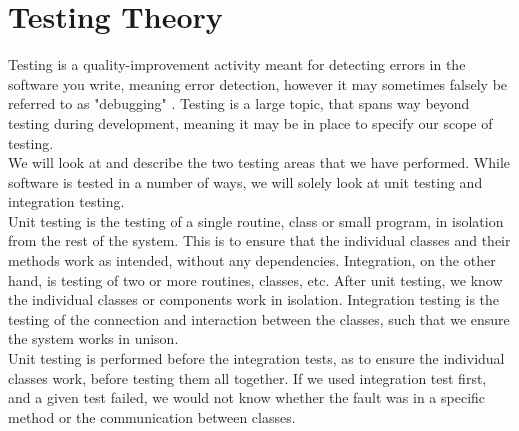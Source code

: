 \section{Testing Theory} \label{TestTheory}
Testing is a quality-improvement activity meant for detecting errors in the software you write, meaning error detection, however it may sometimes falsely be referred to as "debugging" \cite{TestingCodeComplete}. Testing is a large topic, that spans way beyond testing during development, meaning it may be in place to specify our scope of testing. \\
We will look at and describe the two testing areas that we have performed. While software is tested in a number of ways, we will solely look at unit testing and integration testing. \\%
Unit testing is the testing of a single routine, class or small program, in isolation from the rest of the system. This is to ensure that the individual classes and their methods work as intended, without any dependencies\cite{TestingCodeComplete}.
Integration, on the other hand, is testing of two or more routines, classes, etc. After unit testing, we know the individual classes or components work in isolation. Integration testing is the testing of the connection and interaction between the classes, such that we ensure the system works in unison. \\
Unit testing is performed before the integration tests, as to ensure the individual classes work, before testing them all together. If we used integration test first, and a given test failed, we would not know whether the fault was in a specific method or the communication between classes. \\


